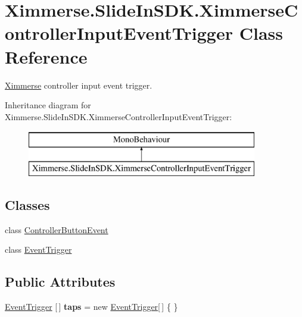 \hypertarget{class_ximmerse_1_1_slide_in_s_d_k_1_1_ximmerse_controller_input_event_trigger}{}\section{Ximmerse.\+Slide\+In\+S\+D\+K.\+Ximmerse\+Controller\+Input\+Event\+Trigger Class Reference}
\label{class_ximmerse_1_1_slide_in_s_d_k_1_1_ximmerse_controller_input_event_trigger}


\mbox{\hyperlink{namespace_ximmerse}{Ximmerse}} controller input event trigger.  


Inheritance diagram for Ximmerse.\+Slide\+In\+S\+D\+K.\+Ximmerse\+Controller\+Input\+Event\+Trigger\+:\begin{figure}[H]
\begin{center}
\leavevmode
\includegraphics[height=2.000000cm]{class_ximmerse_1_1_slide_in_s_d_k_1_1_ximmerse_controller_input_event_trigger}
\end{center}
\end{figure}
\subsection*{Classes}
\begin{DoxyCompactItemize}
\item 
class \mbox{\hyperlink{class_ximmerse_1_1_slide_in_s_d_k_1_1_ximmerse_controller_input_event_trigger_1_1_controller_button_event}{Controller\+Button\+Event}}
\item 
class \mbox{\hyperlink{class_ximmerse_1_1_slide_in_s_d_k_1_1_ximmerse_controller_input_event_trigger_1_1_event_trigger}{Event\+Trigger}}
\end{DoxyCompactItemize}
\subsection*{Public Attributes}
\begin{DoxyCompactItemize}
\item 
\mbox{\label{class_ximmerse_1_1_slide_in_s_d_k_1_1_ximmerse_controller_input_event_trigger_a3ca0e608028058539737282af11542a8}} 
\mbox{\hyperlink{class_ximmerse_1_1_slide_in_s_d_k_1_1_ximmerse_controller_input_event_trigger_1_1_event_trigger}{Event\+Trigger}} \mbox{[}$\,$\mbox{]} {\bfseries taps} = new \mbox{\hyperlink{class_ximmerse_1_1_slide_in_s_d_k_1_1_ximmerse_controller_input_event_trigger_1_1_event_trigger}{Event\+Trigger}}\mbox{[}$\,$\mbox{]} \{ \}
\end{DoxyCompactItemize}


